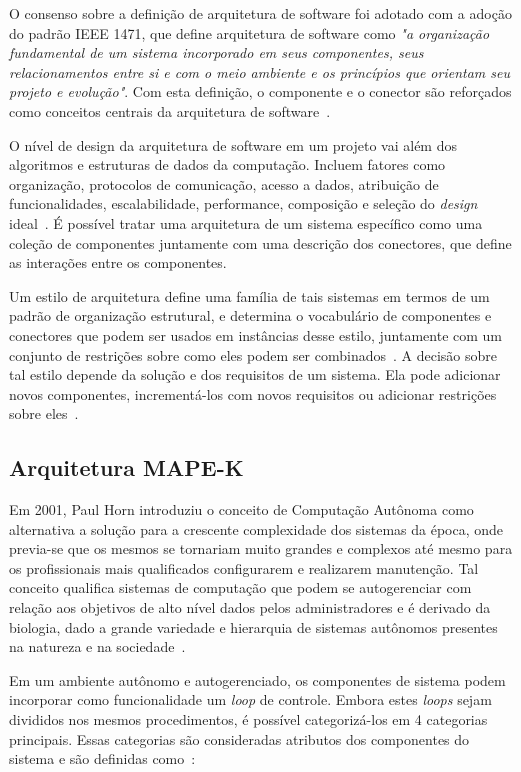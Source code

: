 \documentclass[portugues]{ic-tese}
\begin{document}
O consenso sobre a definição de arquitetura de software foi adotado com a adoção do padrão IEEE 1471, que define arquitetura de software como \textit{"a organização fundamental de um sistema incorporado em seus componentes, seus relacionamentos entre si e com o meio ambiente e os princípios que orientam seu projeto e evolução"}. Com esta definição, o componente e o conector são reforçados como conceitos centrais da arquitetura de software~\citep{Bosch_2004}.

O nível de design da arquitetura de software em um projeto vai além dos algoritmos e estruturas de dados da computação. Incluem fatores como organização, protocolos de comunicação, acesso a dados, atribuição de funcionalidades, escalabilidade, performance, composição e seleção do \textit{design} ideal~\citep{Garlan_1993}. É possível tratar uma arquitetura de um sistema específico como uma coleção de componentes juntamente com uma descrição dos conectores, que define as interações entre os componentes.

Um estilo de arquitetura define uma família de tais sistemas em termos de um padrão de organização estrutural, e determina o vocabulário de componentes e conectores que podem ser usados em instâncias desse estilo, juntamente com um conjunto de restrições sobre como eles podem ser combinados~\citep{Garlan_1993}. A decisão sobre tal estilo depende da solução e dos requisitos de um sistema. Ela pode adicionar novos componentes, incrementá-los com novos requisitos ou adicionar restrições sobre eles~\citep{Bosch_2004}.

\subsection{Arquitetura MAPE-K}

Em 2001, Paul Horn introduziu o conceito de Computação Autônoma como alternativa a solução para a crescente complexidade dos sistemas da época, onde previa-se que os mesmos se tornariam muito grandes e complexos até mesmo para os profissionais mais qualificados configurarem e realizarem manutenção. Tal conceito qualifica sistemas de computação que podem se autogerenciar com relação aos objetivos de alto nível dados pelos administradores e é derivado da biologia, dado a grande variedade e hierarquia de sistemas autônomos presentes na natureza e na sociedade~\citep{Kephart_2003}. 

Em um ambiente autônomo e autogerenciado, os componentes de sistema podem incorporar como funcionalidade um \textit{loop} de controle. Embora estes \textit{loops} sejam divididos nos mesmos procedimentos, é possível categorizá-los em 4 categorias principais. Essas categorias são consideradas atributos dos componentes do sistema e são definidas como~\citep{IBM_2005}:
\end{document}
